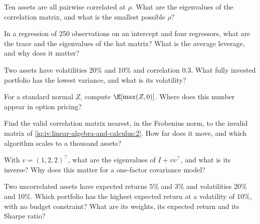 \begin{interviewq}\label{iq:iv:linear-algebra-and-calculus:6}
Ten assets are all pairwise correlated at $\rho$. What are the eigenvalues of the correlation matrix, and what is the
smallest possible $\rho$?
\end{interviewq}

\begin{interviewq}\label{iq:iv:linear-algebra-and-calculus:7}
In a regression of 250 observations on an intercept and four regressors, what are the trace and the eigenvalues of the
hat matrix? What is the average leverage, and why does it matter?
\end{interviewq}

\begin{interviewq}\label{iq:iv:linear-algebra-and-calculus:8}
Two assets have volatilities 20\% and 10\% and correlation 0.3. What fully invested portfolio has the lowest variance,
and what is its volatility?
\end{interviewq}

\begin{interviewq}\label{iq:iv:linear-algebra-and-calculus:9}
For a standard normal $Z$, compute $\E[\max(Z, 0)]$. Where does this number appear in option pricing?
\end{interviewq}

\begin{interviewq}\label{iq:iv:linear-algebra-and-calculus:10}
Find the valid correlation matrix nearest, in the Frobenius norm, to the invalid matrix of
\cref{iq:iv:linear-algebra-and-calculus:2}. How far does it move, and which algorithm scales to a thousand assets?
\end{interviewq}

\begin{interviewq}\label{iq:iv:linear-algebra-and-calculus:11}
With $v = (1, 2, 2)^\top$, what are the eigenvalues of $I + vv^\top$, and what is its inverse? Why does this matter for a
one-factor covariance model?
\end{interviewq}

\begin{interviewq}\label{iq:iv:linear-algebra-and-calculus:12}
Two uncorrelated assets have expected returns 5\% and 3\% and volatilities 20\% and 10\%. Which portfolio has the highest
expected return at a volatility of 10\%, with no budget constraint? What are its weights, its expected return and its
Sharpe ratio?
\end{interviewq}

